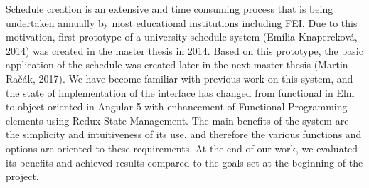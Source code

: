 Schedule creation is an extensive and time consuming process that is being undertaken annually by most educational institutions including FEI. Due to this motivation, first prototype of a university schedule system (Emília Knapereková, 2014) was created in the master thesis in 2014. Based on this prototype, the basic application of the schedule was created later in the next master thesis (Martin Račák, 2017). We have become familiar with previous work on this system, and the state of implementation of the interface has changed from functional in Elm to object oriented in Angular 5 with enhancement of Functional Programming elements using Redux State Management. The main benefits of the system are the simplicity and intuitiveness of its use, and therefore the various functions and options are oriented to these requirements. At the end of our work, we evaluated its benefits and achieved results compared to the goals set at the beginning of the project.